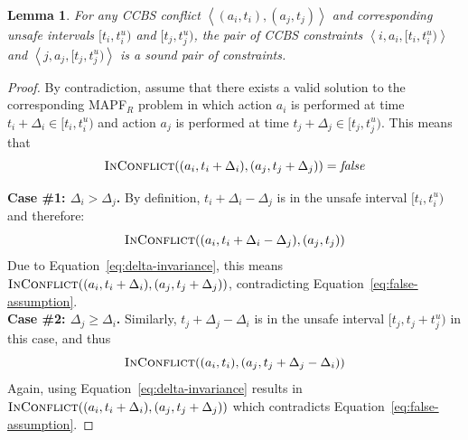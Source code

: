 \documentclass[review]{elsarticle}
\newtheorem{lemma}{Lemma}
\newcommand{\tuple}[1]{\ensuremath{\left \langle #1 \right \rangle }}
\newcommand{\ccbs}{\ac{CCBS}\xspace}
\newcommand{\mapfr}{\ac{MAPF}$_R$\xspace}
\newcommand{\false}{\textit{false}\xspace}
\newcommand{\inconflict}{\textsc{InConflict}\xspace}
\begin{document}
\begin{lemma}
For any \ccbs conflict $\tuple{(a_i, t_i), (a_j, t_j)}$ 
and corresponding unsafe intervals $[t_i,t^u_i)$
and $[t_j,t^u_j)$, 
the pair of \ccbs constraints 
$\tuple{i,a_i,[t_i,t^u_i)}$ and
$\tuple{j,a_j,[t_j,t^u_j)}$ 
is a sound pair of constraints.
\label{lem:sound}
\end{lemma}
\begin{proof}
By contradiction, assume that there exists a valid solution to the corresponding \mapfr problem 
in which action $a_i$ is performed at time $t_i+\Delta_i\in [t_i,t^u_i)$
and action $a_j$ is performed at time $t_j+\Delta_j\in [t_j,t^u_j)$. This means that
\begin{equation}
    \inconflict((a_i,t_i+\Delta_i),(a_j,t_j+\Delta_j))=\false
    \label{eq:false-assumption}
\end{equation}

\textbf{Case \#1: $\Delta_i>\Delta_j$.} 
By definition, $t_i+\Delta_i-\Delta_j$ is in the unsafe interval $[t_i,t_i^u)$ and therefore:
\begin{equation}
    \inconflict((a_i, t_i+\Delta_i-\Delta_j), (a_j,t_j))
\end{equation}
Due to Equation~\ref{eq:delta-invariance}, this means
$\inconflict((a_i, t_i+\Delta_i),(a_j,t_j+\Delta_j))$, contradicting Equation~\ref{eq:false-assumption}.\\ 

\textbf{Case \#2: $\Delta_j\geq\Delta_i$.}
Similarly, $t_j+\Delta_j-\Delta_i$ is in the unsafe interval $[t_j, t_j+t_j^u)$ in this case, and thus 
\begin{equation}
    \inconflict((a_i, t_i), (a_j,t_j+\Delta_j-\Delta_i))
\end{equation}
Again, using Equation~\ref{eq:delta-invariance} results in 
$\inconflict((a_i, t_i+\Delta_i),(a_j,t_j+\Delta_j))$ which contradicts Equation~\ref{eq:false-assumption}. 
\end{proof}
\end{document}
